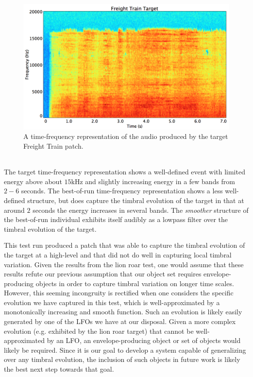 \documentclass[12pt]{report} 	%
\numberwithin{figure}{chapter}
\numberwithin{table}{chapter}
\numberwithin{equation}{chapter}
\begin{document}
\begin{flushleft}
\begin{figure}[h!]
\begin{center}
\includegraphics[scale=0.35,width=\linewidth]{FreightTrainTargetSTFT}
\caption[Target freight train time-frequency representation]{A time-frequency representation of the audio produced by the target Freight Train patch.}
\end{center}
\end{figure}
\\
The target time-frequency representation shows a well-defined event with limited energy above about $15$kHz and slightly increasing energy in a few bands from $2-6$ seconds. The best-of-run time-frequency representation shows a less well-defined structure, but does capture the timbral evolution of the target in that at around $2$ seconds the energy increases in several bands. The \textit{smoother} structure of the best-of-run individual exhibits itself audibly as a lowpass filter over the timbral evolution of the target.

This test run produced a patch that was able to capture the timbral evolution of the target at a high-level and that did not do well in capturing local timbral variation. Given the results from the lion roar test, one would assume that these results refute our previous assumption that our object set requires envelope-producing objects in order to capture timbral variation on longer time scales. However, this seeming incongruity is rectified when one considers the specific evolution we have captured in this test, which is well-approximated by a monotonically increasing and smooth function. Such an evolution is likely easily generated by one of the LFOs we have at our disposal. Given a more complex evolution (e.g. exhibited by the lion roar target) that cannot be well-approximated by an LFO, an envelope-producing object or set of objects would likely be required. Since it is our goal to develop a system capable of generalizing over any timbral evolution, the inclusion of such objects in future work is likely the best next step towards that goal.


\end{flushleft}
\end{document}
